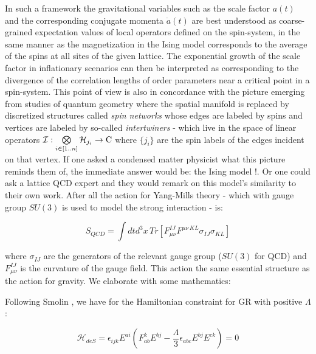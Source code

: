\documentclass[11pt,english,rmp]{revtex4}
\begin{document}
In such a framework the gravitational variables such as the scale
factor $a(t)$ and the corresponding conjugate momenta $\dot{a}(t)$
are best understood as coarse-grained expectation values of local
operators defined on the spin-system, in the same manner as the magnetization
in the Ising model corresponds to the average of the spins at all
sites of the given lattice. The exponential growth of the scale factor
in inflationary scenarios can then be interpreted as corresponding
to the divergence of the correlation lengths of order parameters near
a critical point in a spin-system. This point of view is also in concordance
with the picture emerging from studies of quantum geometry where the
spatial manifold is replaced by discretized structures called \emph{spin
networks} whose edges are labeled by spins and vertices are labeled
by so-called \emph{intertwiners} - which live in the space of linear
operators $\mathcal{I}:\bigotimes\limits _{i\in[1..n]}\mathcal{H}_{j_{i}}\rightarrow{\rm {C}}$
where $\{j_{i}\}$ are the spin labels of the edges incident on that
vertex. If one asked a condensed matter physicist what this picture
reminds them of, the immediate answer would be: the Ising model !.
Or one could ask a lattice QCD expert and they would remark on this
model's similarity to their own work. After all the action for Yang-Mills
theory - which with gauge group $SU(3)$ is used to model the strong
interaction - is:

\begin{equation}
S_{QCD}=\int dtd^{3}x\, Tr \left[ F_{\mu\nu}^{IJ}F^{\mu\nu\, KL}\sigma_{IJ}\sigma_{KL} \right] \end{equation}


where $\sigma_{IJ}$ are the generators of the relevant gauge group
($SU(3)$ for QCD) and $F_{\mu\nu}^{IJ}$ is the curvature of the
gauge field. This action the same essential structure as the action
for gravity. We elaborate with some mathematics:

Following Smolin \cite{Smolin2002Quantum}, we have for the Hamiltonian
constraint for GR with positive $\Lambda$:

\begin{equation}
\mathcal{H}_{deS}=\epsilon_{ijk}E^{ai}\left(F_{ab}^{k}E^{bj}-\frac{\Lambda}{3}\epsilon_{abc}E^{bj}E^{ck}\right)=0\label{eqn:deSitterHamiltonian}\end{equation}
\end{document}
